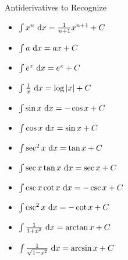 \begin{frame}{Antiderivatives to Recognize}
\begin{itemize}
\item $\int x^n\ \text{d} x=\frac{1}{n+1}x^{n+1}+C$
\item  $\int a \ \text{d} x=ax+C$ 
\item $\int e^x\ \text{d} x=e^x+C$
\item	$\int\frac{1}{x}\ \text{d} x=\log|x|+C$ 
\item $\int \sin x \ \text{d} x=-\cos x +C$ 
\item $\int \cos x \ \text{d} x=\sin x +C$
\item	$\int \sec^2 x \ \text{d} x=\tan x +C$ 
\item $\int \sec x \tan x \ \text{d} x=\sec x +C$ 
\item $\int \csc x \cot x \ \text{d} x=-\csc x +C$
\item	$\int \csc^2 x \ \text{d} x=-\cot x +C$ 
\item $\int \frac{1}{1+x^2}\ \text{d} x=\arctan x +C$ 
\item $\int\frac{1}{\sqrt{1-x^2}} \ \text{d} x=\arcsin x +C$
\end{itemize}
\end{frame}


